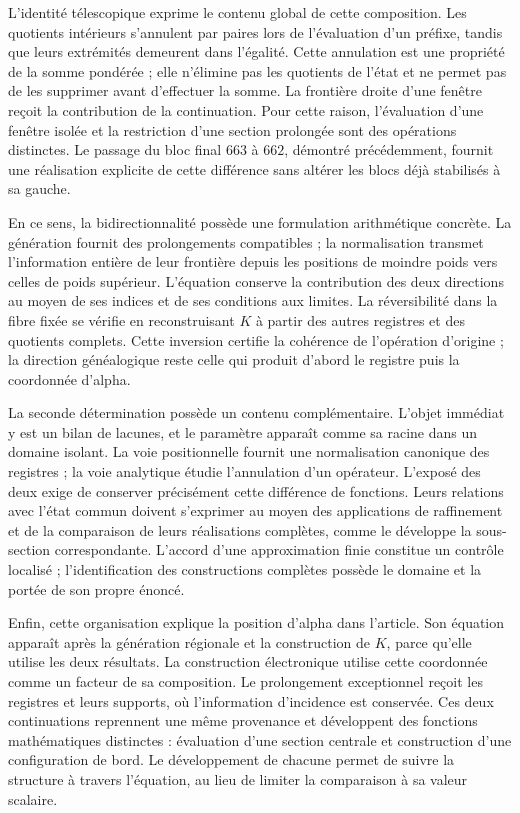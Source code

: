 L'identité télescopique exprime le contenu global de cette composition.
Les quotients intérieurs s'annulent par paires lors de l'évaluation d'un préfixe,
tandis que leurs extrémités demeurent dans l'égalité. Cette annulation est une
propriété de la somme pondérée ; elle n'élimine pas les quotients de l'état et
ne permet pas de les supprimer avant d'effectuer la somme. La frontière droite d'une
fenêtre reçoit la contribution de la continuation. Pour cette raison,
l'évaluation d'une fenêtre isolée et la restriction d'une section
prolongée sont des opérations distinctes. Le passage du bloc final $663$ à
$662$, démontré précédemment, fournit une réalisation explicite de cette
différence sans altérer les blocs déjà stabilisés à sa gauche.

En ce sens, la bidirectionnalité possède une formulation arithmétique
concrète. La génération fournit des prolongements compatibles ; la
normalisation transmet l'information entière de leur frontière depuis les
positions de moindre poids vers celles de poids supérieur. L'équation conserve la
contribution des deux directions au moyen de ses indices et de ses conditions
aux limites. La réversibilité dans la fibre fixée se vérifie en reconstruisant
$K$ à partir des autres registres et des quotients complets. Cette
inversion certifie la cohérence de l'opération d'origine ; la direction
généalogique reste celle qui produit d'abord le registre puis
la coordonnée d'alpha.

La seconde détermination possède un contenu complémentaire. L'objet
immédiat y est un bilan de lacunes, et le paramètre apparaît comme
sa racine dans un domaine isolant. La voie positionnelle fournit une
normalisation canonique des registres ; la voie analytique étudie l'annulation
d'un opérateur. L'exposé des deux exige de conserver précisément
cette différence de fonctions. Leurs relations avec l'état commun doivent
s'exprimer au moyen des applications de raffinement et de la comparaison de
leurs réalisations complètes, comme le développe la sous-section
correspondante. L'accord d'une approximation finie constitue un
contrôle localisé ; l'identification des constructions complètes
possède le domaine et la portée de son propre énoncé.

Enfin, cette organisation explique la position d’alpha dans l’article.
Son équation apparaît après la génération régionale et la construction
de $K$, parce qu’elle utilise les deux résultats. La construction électronique
utilise cette coordonnée comme un facteur de sa composition. Le prolongement
exceptionnel reçoit les registres et leurs supports, où l’information
d’incidence est conservée. Ces deux continuations reprennent une même
provenance et développent des fonctions mathématiques distinctes : évaluation d’une
section centrale et construction d’une configuration de bord.
Le développement de chacune permet de suivre la structure à travers
l’équation, au lieu de limiter la comparaison à sa valeur scalaire.
